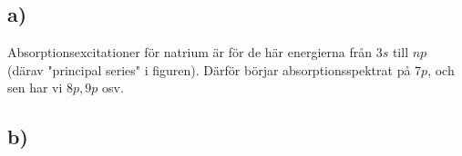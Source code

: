 \subsection{a)}
Absorptionsexcitationer för natrium är för de här energierna från $3s$ till $np$ (därav "principal series" i figuren). Därför
börjar absorptionsspektrat på $7p$, och sen har vi $8p, 9p$ osv.

\subsection{b)}
